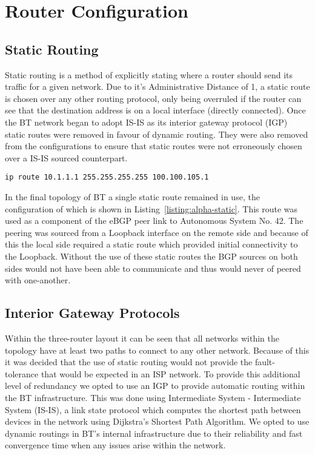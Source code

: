\chapter{Router Configuration}
\section{Static Routing} Static routing is a
method of explicitly stating where a router should send its traffic for a given
network. Due to it's Administrative Distance of 1, a static route is chosen
over any other routing protocol, only being overruled if the router can see
that the destination address is on a local interface (directly connected). Once
the BT network began to adopt IS-IS as its interior gateway protocol (IGP)
static routes were removed in favour of dynamic routing. They were also removed
from the configurations to ensure that static routes were not erroneously
chosen over a IS-IS sourced counterpart.

\begin{lstlisting}[caption={Alpha Static Route}, label={listing:alpha-static}]
ip route 10.1.1.1 255.255.255.255 100.100.105.1
\end{lstlisting}

In the final topology of BT a single static route remained in use, the
configuration of which is shown in Listing~\ref{listing:alpha-static}. This
route was used as a component of the eBGP peer link to Autonomous System No.
42. The peering was sourced from a Loopback interface on the remote side and
    because of this the local side required a static route which provided
    initial connectivity to the Loopback. Without the use of these static
    routes the BGP sources on both sides would not have been able to
    communicate and thus would never of peered with one-another.

\section{Interior Gateway Protocols}
Within the three-router layout it can be seen that all networks within the
topology have at least two paths to connect to any other network. Because of
this it was decided that the use of static routing would not provide the fault-
tolerance that would be expected in an ISP network. To provide this additional
level of redundancy we opted to use an IGP to provide automatic routing within
the BT infrastructure. This was done using Intermediate System - Intermediate
System (IS-IS), a link state protocol which computes the shortest path between
devices in the network using Dijkstra's Shortest Path Algorithm. We opted to
use dynamic routings in BT's internal infrastructure due to their reliability
and fast convergence time when any issues arise within the network.

